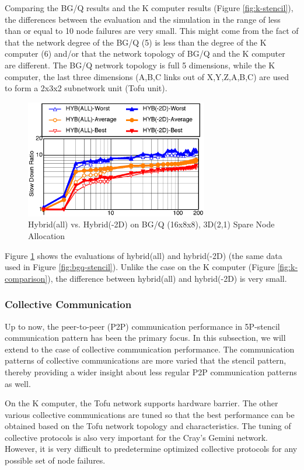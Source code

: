 \documentclass[Afour,times,sagev]{sagej}
\begin{document}
Comparing the BG/Q results and the K computer results (Figure
\ref{fig:k-stencil}), the differences between the evaluation and the
simulation in the range of less than or equal to 10 node failures are
very small. This might come from the fact of that the network degree
of the BG/Q (5) is less than the degree of the K computer (6) and/or
that the network topology of BG/Q and the K computer are different.
The BG/Q network topology is full 5 dimensions, while the K computer,
the last three dimensions (A,B,C links out of X,Y,Z,A,B,C) are used to
form a 2x3x2 subnetwork unit (Tofu unit). 

\begin{figure}[ht]
\centering
\includegraphics[width=80mm]{Figs/BGQ-comparison-CL.eps}
  \caption{Hybrid(all) vs. Hybrid(-2D) on BG/Q (16x8x8), 3D(2,1) Spare
    Node Allocation}
  \label{fig:bgq-comparison}
\end{figure}

Figure \ref{fig:bgq-comparison} shows the evaluations of hybrid(all)
and hybrid(-2D) (the same data used in Figure
\ref{fig:bgq-stencil}). Unlike the case on the K computer (Figure
\ref{fig:k-comparison}), the difference between hybrid(all) and
hybrid(-2D) is very small.

\subsubsection{Collective Communication}

Up to now, the peer-to-peer (P2P) communication performance in
5P-stencil communication pattern has been the primary focus. In this
subsection, we will extend to the case of collective communication
performance.
The communication patterns of collective communications are more
varied that the stencil pattern, thereby providing a wider insight
about less regular P2P communication patterns as well.

On the K computer, the Tofu network supports hardware barrier. The
other various collective communications are tuned so that the best
performance can be obtained based on the Tofu network topology and 
characteristics\cite{sumimoto-k}. The tuning of collective protocols
is also very important for the Cray's Gemini
network\cite{Pena:2013:ATM:2488551.2488564}. However, it is very
difficult to predetermine optimized collective protocols for any
possible set of node failures. 
\end{document}
